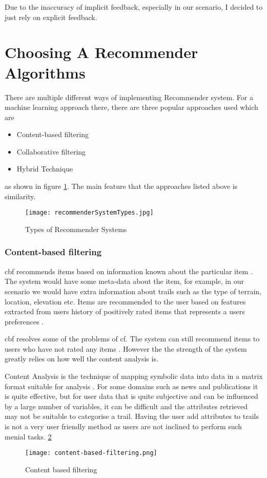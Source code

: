 Due to the inaccuracy of implicit feedback, especially in our scenario, I decided to just rely on explicit feedback.

\section{Choosing A Recommender Algorithms} \label{chooseRecAlg}
There are multiple different ways of implementing Recommender system. For a machine learning approach there, there are three popular approaches used which are
\begin{itemize}
    \item Content-based filtering
    \item Collaborative filtering
    \item Hybrid Technique
\end{itemize}
as shown in figure \ref{fig:recommenderSystemTypes}. The main feature that the approaches listed above is similarity.

\begin{figure}[ht]
    \centering
    \texttt{[image: recommenderSystemTypes.jpg]}
    \caption{Types of Recommender Systems}
    \label{fig:recommenderSystemTypes}
\end{figure}

\subsubsection{Content-based filtering}
\acrfull{cbf} recommends items based on information known about the particular item \cite{pazzani2007content}. The system would have some meta-data about the item, for example, in our scenario we would have extra information about trails such as the type of terrain, location, elevation etc. Items are recommended to the user based on features extracted from users history of positively rated items that represents a users preferences \cite{isinkaye2015recommendation}.

\acrshort{cbf} resolves some of the problems of \acrshort{cf}. The system can still recommend items to users who have not rated any items \cite{burke2002hybrid}. However the the strength of the system greatly relies on how well the content analysis is. 

Content Analysis is the technique of mapping symbolic data into data in a matrix format suitable for analysis \cite{roberts2001content}. For some domains such as news and publications it is quite effective, but for user data that is quite subjective and can be influenced by a large number of variables, it can be difficult and the attributes retrieved may not be suitable to categorise a trail. Having the user add attributes to trails is not a very user friendly method as users are not inclined to perform such menial tasks.
 \ref{fig:contentBasedFiltering}
\begin{figure}[ht]
    \centering
    \texttt{[image: content-based-filtering.png]}
    \caption{Content based filtering}
    \label{fig:contentBasedFiltering}
\end{figure}

